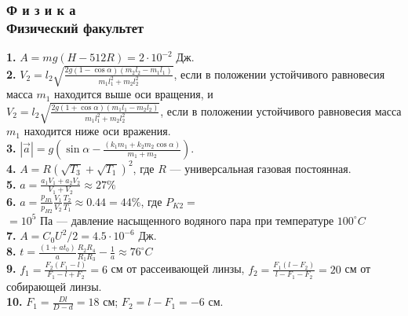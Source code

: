 \begin{multicols}{2}
    \subsubsection*{Ф и з и к а\\ Физический факультет}
    \textbf{1.} $A=mg(H - 512R)=2\cdot 10^{-2}$ Дж.\\
    \textbf{2.} $V_2=l_2\sqrt{\frac{2g(1-\cos\alpha)(m_2l_2-m_1l_1)}{m_1l_1^2+m_2l_2^2}}$, если в положении устойчивого равновесия масса $m_1$ находится выше оси вращения, и\\ 
    $V_2=l_2\sqrt{\frac{2g(1+\cos\alpha)(m_1l_1-m_2l_2)}{m_1l_1^2+m_2l_2^2}}$, если в положении устойчивого равновесия масса $m_1$ находится ниже оси вражения.\\
    \textbf{3.} $|\overset{\rightarrow}{a}|=g(\sin\alpha-\frac{(k_1m_1+k_2m_2\cos\alpha)}{m_1+m_2})$.\\
    \textbf{4.} $A=R(\sqrt{T_3}+\sqrt{T_1})^2$, где $R$ --- универсальная газовая постоянная.\\
    \textbf{5.} $a=\frac{a_1V_1+a_2V_2}{V_1+V_2}\approx27\%$\\
    \textbf{6.} $a=\frac{p_{H1}}{p_{H2}}\frac{V_1}{V_2}\frac{T_2}{T_1}\approx0.44=44\%$, где $P_{K2}=$\\
    $=10^5$ Па --- давление насыщенного водяного пара при температуре $100^{\circ}C$\\
    \textbf{7.} $A=C_0U^2/2=4.5\cdot10^{-6}$ Дж.\\
    \textbf{8.} $t=\frac{(1+at_0)}{a}\frac{R_2R_4}{R_1R_3}-\frac{1}{a}\approx76^{\circ}C$\\
    \textbf{9.} $f_1=\frac{F_2(F_1-l)}{F_1-l+F_2}=6$ см от рассеивающей линзы, $f_2=\frac{F_1(l-F_2)}{l-F_1-F_2}=20$ см от собирающей линзы.\\
    \textbf{10.} $F_1=\frac{Dl}{D-d}=18$ см; $F_2=l-F_1=-6$ см.

\end{multicols}

